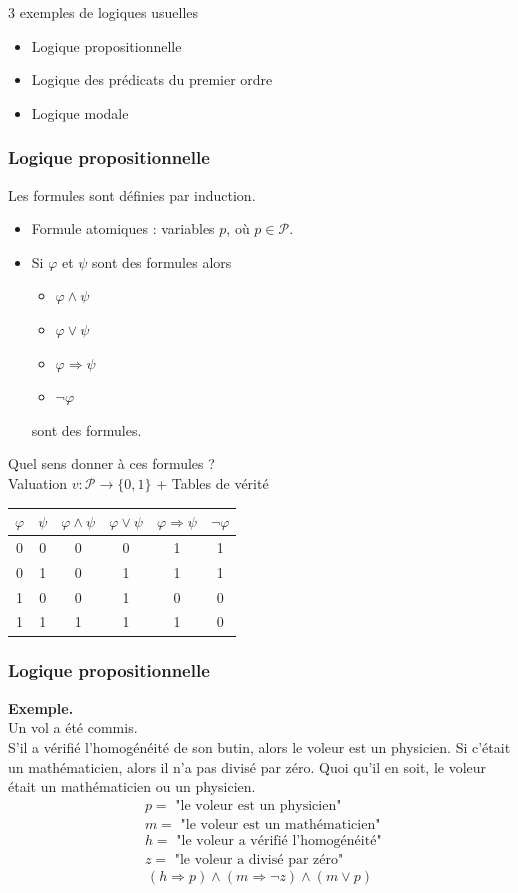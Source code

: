 \documentclass{beamer}
\newcommand{\itemz}{\item[$\triangleright$]}
\begin{document}
\begin{frame}
3 exemples de logiques usuelles
\begin{itemize}
\itemz Logique propositionnelle
\itemz Logique des prédicats du premier ordre
\itemz Logique modale
\end{itemize}
\end{frame}

\begin{frame}
\frametitle{Logique propositionnelle}
Les formules sont définies par induction.
\pause
\begin{itemize}
\itemz Formule atomiques : variables $p$, où $p \in \mathcal{P}$.
\pause
\itemz Si $\varphi$ et $\psi$ sont des formules alors
\pause
\begin{itemize}
\itemz $\varphi \wedge \psi$
\pause
\itemz $\varphi \vee \psi$
\pause
\itemz $\varphi \Rightarrow \psi$
\pause
\itemz $\neg \varphi$
\end{itemize}
sont des formules.
\end{itemize}
\pause
Quel sens donner à ces formules ? \\
Valuation $v : \mathcal{P} \to \{0,1\}$ + Tables de vérité
\pause
\begin{center}
\begin{tabular}{|c|c|c|c|c|c|}
  \hline
  $\varphi$ & $\psi$ & $\varphi \wedge \psi$ & $\varphi \vee \psi$ & $\varphi \Rightarrow \psi$ & $\neg \varphi$ \\
  \hline
  0 & 0 & 0 & 0 & 1 & 1 \\ 
  0 & 1 & 0 & 1 & 1 & 1 \\
  1 & 0 & 0 & 1 & 0 & 0 \\
  1 & 1 & 1 & 1 & 1 & 0 \\
  \hline
\end{tabular}
\end{center}
\end{frame}

\begin{frame}
\frametitle{Logique propositionnelle}
\textbf{Exemple.}\\
Un vol a été commis.\\
S'il a vérifié l'homogénéité de son butin, alors le voleur est un physicien. Si c'était un mathématicien, alors il n'a pas divisé par zéro. Quoi qu'il en soit, le voleur était un mathématicien ou un physicien. \pause
\begin{align*}
& p = \text{ "le voleur est un physicien" } \\
& m = \text{ "le voleur est un mathématicien" } \\
& h = \text{ "le voleur a vérifié l'homogénéité" } \\
& z = \text{ "le voleur a divisé par zéro" }
\end{align*}
\pause
\[ (h \Rightarrow p) \wedge (m \Rightarrow \neg z) \wedge (m \vee p) \]
\end{frame}
\end{document}
